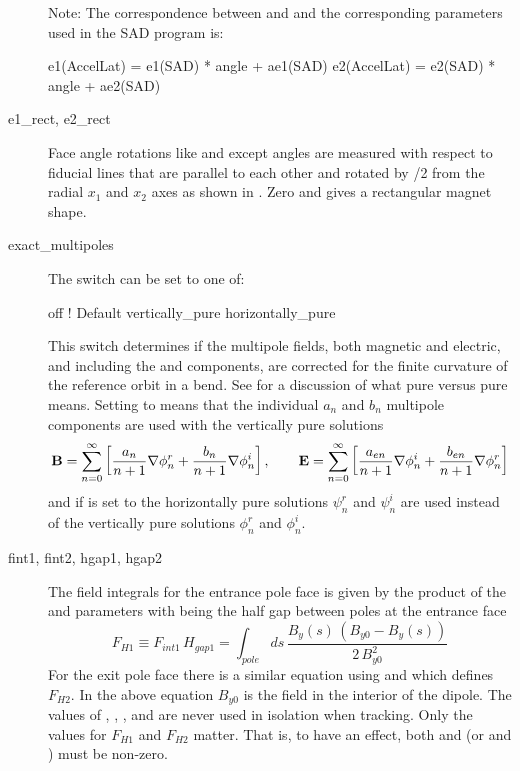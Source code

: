 \begin{description}
Note: The correspondence between  and  and the corresponding parameters used in the
SAD program \cite{b:sad} is:
\begin{example}
  e1(AccelLat) =  e1(SAD) * angle + ae1(SAD)
  e2(AccelLat) =  e2(SAD) * angle + ae2(SAD)
\end{example}
  \item[e1_rect, e2_rect]
Face angle rotations like  and  except angles are measured with respect to 
fiducial lines that are parallel to each other and rotated by /2 from the radial
$x_1$ and $x_2$ axes as shown in . 
Zero  and  gives a rectangular magnet shape.
  \item[exact_multipoles] \Newline
The  switch can be set to one of:
\begin{example}
  off                 ! Default
  vertically_pure    
  horizontally_pure  
\end{example}
This switch determines if the multipole fields, both magnetic and electric, and including the
 and  components, are corrected for the finite curvature of the reference orbit in a
bend. See  for a discussion of what  pure versus
 pure means. Setting  to  means that the
individual $a_n$ and $b_n$ multipole components are used with the vertically pure solutions
\begin{equation}
  {\bf B} = \sum_{n = 0}^\infty \left[ \frac{a_n}{n+1} \nabla \phi_n^r + \frac{b_n}{n+1} \nabla \phi_n^i \right], \qquad
  {\bf E} = \sum_{n = 0}^\infty \left[ \frac{a_{en}}{n+1} \nabla \phi_n^i + \frac{b_{en}}{n+1} \nabla \phi_n^r \right]
\end{equation}
and if  is set to  the horizontally pure solutions
$\psi_n^r$ and $\psi_n^i$ are used instead of the vertically pure solutions $\phi_n^r$ and
$\phi_n^i$.
  \item[fint1, fint2, hgap1, hgap2] \Newline
The field integrals for the entrance pole face is given by the product of the  and
 parameters with  being the half gap between poles at the entrance face
\begin{equation}
  F_{H1} \equiv F_{int1} \, H_{gap1} = \int_{pole} \! \! ds \, \frac{B_y(s) \, (B_{y0} - B_y(s))}
  {2 \, B_{y0}^2}
  \label{fsbbb}
\end{equation}
For the exit pole face there is a similar equation using  and  which defines
$F_{H2}$. In the above equation $B_{y0}$ is the field in the interior of the dipole. The values of
, , , and  are never used in isolation when tracking. Only
the values for $F_{H1}$ and $F_{H2}$ matter.
That is, to have an effect, both  and  (or  and ) must be non-zero.


\end{description}
